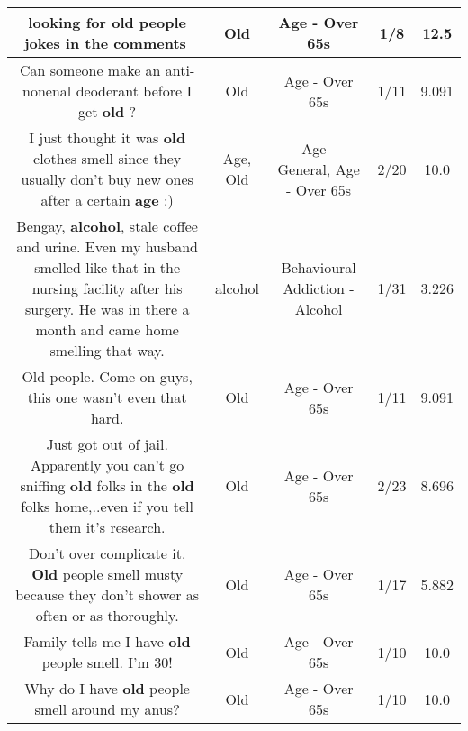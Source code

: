 \documentclass[11pt]{article}
\newlength\mylength
\begin{document}
\begin{center}
\begin{longtable}{|C{.65\mylength}|C{.30\mylength}|C{.12\mylength}|C{.12\mylength}|C{.12\mylength}|}
  \small looking for \textbf{old} people jokes in the comments🤣\normalsize   & Old & Age - Over 65s & 1/8 & 12.5 \\  \hline
  \small Can someone make an anti-nonenal deoderant before I get \textbf{old} ?\normalsize   & Old & Age - Over 65s & 1/11 & 9.091 \\  \hline
  \small I just thought it was \textbf{old} clothes smell since they usually don't buy new ones after a certain \textbf{age} :)\normalsize   & Age, Old & Age - General, Age - Over 65s & 2/20 & 10.0 \\  \hline
  \small Bengay, \textbf{alcohol}, stale coffee and urine.  Even my husband smelled like that in the nursing facility after his surgery.  He was in there a month and came home smelling that way.\normalsize   & alcohol & Behavioural Addiction - Alcohol & 1/31 & 3.226 \\  \hline
  \small Old people. Come on guys, this one wasn't even that hard.\normalsize   & Old & Age - Over 65s & 1/11 & 9.091 \\  \hline
  \small Just got out of jail. Apparently you can't go sniffing \textbf{old} folks in the \textbf{old} folks home,..even if you tell them it's research.\normalsize   & Old & Age - Over 65s & 2/23 & 8.696 \\  \hline
  \small Don't over complicate it. \textbf{Old} people smell musty because they don't shower as often or as thoroughly.\normalsize   & Old & Age - Over 65s & 1/17 & 5.882 \\  \hline
  \small Family tells me I have \textbf{old} people smell. I'm 30!\normalsize   & Old & Age - Over 65s & 1/10 & 10.0 \\  \hline
  \small Why do I have \textbf{old} people smell around my anus?\normalsize   & Old & Age - Over 65s & 1/10 & 10.0 \\  \hline

\end{longtable}
\end{center}
\end{document}
